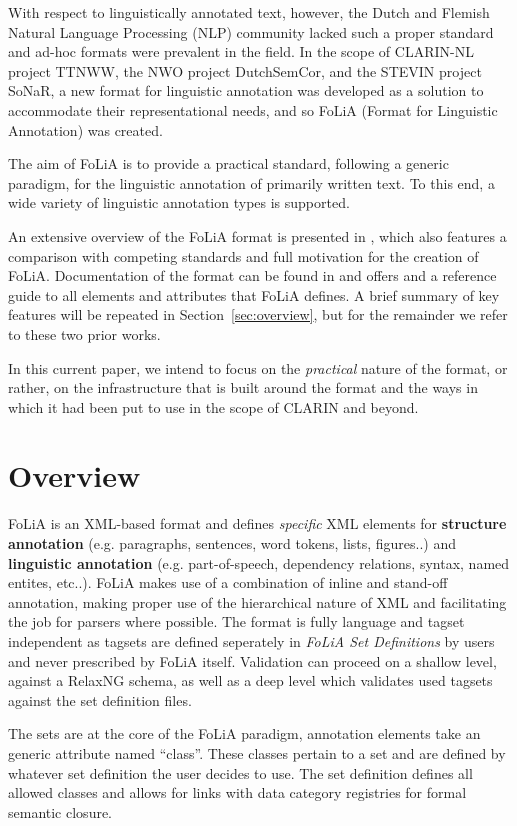 With respect to linguistically annotated text, however, the Dutch and Flemish
Natural Language Processing (NLP) community lacked such a proper standard and ad-hoc formats were prevalent
in the field.  In the scope of CLARIN-NL project TTNWW, the NWO project
DutchSemCor, and the STEVIN project SoNaR, a new format for linguistic
annotation was developed as a solution to accommodate their representational needs, and so
FoLiA (Format for Linguistic Annotation) was created.

The aim of FoLiA is to provide a practical standard, following a generic
paradigm, for the linguistic annotation of primarily written text. To this end,
a wide variety of linguistic annotation types is supported. 

An extensive overview of the FoLiA format is presented in \cite{FOLIAPAPER},
which also features a comparison with competing standards and full motivation
for the creation of FoLiA. Documentation of the format  can be found in
\cite{FOLIADOC} and offers and a reference guide to all elements and attributes
that FoLiA defines.  A brief summary of key features will be repeated in
Section~\ref{sec:overview}, but for the remainder we refer to these two prior
works.

In this current paper, we intend to focus on the \emph{practical} nature of the
format, or rather, on the infrastructure that is built around the format and
the ways in which it had been put to use in the scope of CLARIN and beyond.

\section{Overview}

FoLiA is an XML-based format and defines \emph{specific} XML elements for \textbf{structure
annotation} (e.g. paragraphs, sentences, word tokens, lists, figures..) and
\textbf{linguistic annotation} (e.g. part-of-speech, dependency relations,
syntax, named entites, etc..). FoLiA makes use of a combination of inline and
stand-off annotation, making proper use of the hierarchical nature of XML and
facilitating the job for parsers where possible. The format is fully language and
tagset independent as tagsets are defined seperately in \emph{FoLiA Set Definitions}
by users and never prescribed by FoLiA itself. Validation can proceed
on a shallow level, against a RelaxNG schema, as well as a deep level which
validates used tagsets against the set definition files.

The sets are at the core of the FoLiA paradigm, annotation elements take an
generic attribute named ``class''. These classes pertain to a set and are
defined by whatever set definition the user decides to use. The set definition
defines all allowed classes and allows for links with data category registries
for formal semantic closure.

